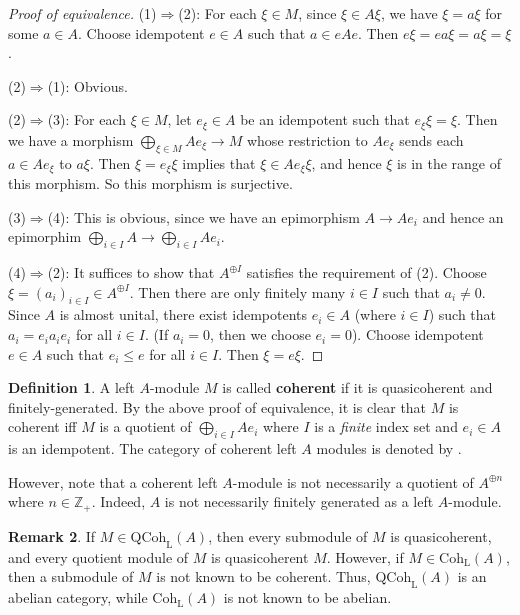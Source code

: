\documentclass[11pt,b5paper,notitlepage]{article}
\theoremstyle{definition}
\newtheorem{df}{Definition}[section]
\newtheorem{rem}[df]{Remark}
\theoremstyle{plain}
\newcommand{\Zbb}{\mathbb Z}
\newcommand{\QC}{\mathrm{QCoh}_{\mathrm L}}
\newcommand{\Coh}{\mathrm{Coh}_{\mathrm L}}
\numberwithin{equation}{section}
\begin{document}
\begin{proof}[Proof of equivalence]
(1)$\Rightarrow$(2): For each $\xi\in M$, since $\xi\in A\xi$, we have $\xi=a\xi$ for some $a\in A$. Choose idempotent $e\in A$ such that $a\in eAe$. Then $e\xi=ea\xi=a\xi=\xi$.

(2)$\Rightarrow$(1): Obvious.

(2)$\Rightarrow$(3): For each $\xi\in M$, let $e_\xi\in A$ be an idempotent such that $e_\xi\xi=\xi$. Then we have a morphism $\bigoplus_{\xi\in M}Ae_\xi\rightarrow M$ whose restriction to $Ae_\xi$ sends each $a\in Ae_\xi$ to $a\xi$. Then $\xi=e_\xi\xi$ implies that $\xi\in Ae_\xi\xi$, and hence $\xi$ is in the range of this morphism. So this morphism is surjective.

(3)$\Rightarrow$(4): This is obvious, since we have an epimorphism $A\rightarrow Ae_i$ and hence an epimorphim $\bigoplus_{i\in I}A\rightarrow \bigoplus_{i\in I}Ae_i$.

(4)$\Rightarrow$(2): It suffices to show that $A^{\oplus I}$ satisfies the requirement of (2). Choose $\xi=(a_i)_{i\in I}\in A^{\oplus I}$. Then there are only finitely many $i\in I$ such that $a_i\ne 0$. Since $A$ is almost unital, there exist idempotents $e_i\in A$ (where $i\in I$) such that $a_i=e_i a_i e_i$ for all $i\in I$. (If $a_i=0$, then we choose $e_i=0$). Choose idempotent $e\in A$ such that $e_i\leq e$ for all $i\in I$. Then $\xi=e\xi$.
\end{proof}

\begin{df}\label{lb26}
A left $A$-module $M$ is called \textbf{coherent} if it is quasicoherent and finitely-generated. By the above proof of equivalence, it is clear that $M$ is coherent iff $M$ is a quotient of $\bigoplus_{i\in I}Ae_i$ where $I$ is a \textit{finite} index set and $e_i\in A$ is an idempotent. The category of coherent left $A$ modules is denoted by \pmb{$\Coh(A)$}.
\end{df}


However, note that a coherent left $A$-module is not necessarily a quotient of $A^{\oplus n}$ where $n\in\Zbb_+$. Indeed, $A$ is not necessarily finitely generated as a left $A$-module.

\begin{rem}\label{lb55}
If $M\in\QC(A)$, then every submodule of $M$ is quasicoherent, and every quotient module of $M$ is quasicoherent $M$. However, if $M\in \Coh(A)$, then a submodule of $M$ is not known to be coherent. Thus, $\QC(A)$ is an abelian category, while $\Coh(A)$ is not known to be abelian.
\end{rem}
\end{document}
